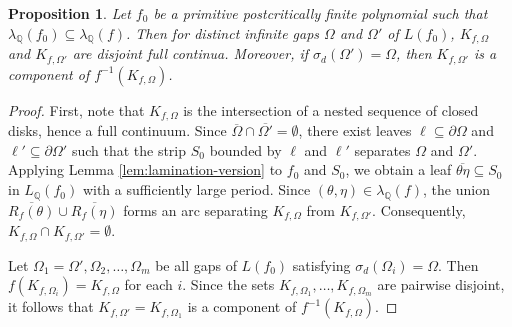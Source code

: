 \documentclass[a4paper,reqno,times, 11pt]{amsart}
\newtheorem{proposition}[theorem]{Proposition}
\theoremstyle{remark}
\theoremstyle{plain}
\numberwithin{equation}{section}
\def\Q{\mathbb Q}
\begin{document}
	
	\begin{proposition}\label{pro:ren}
	Let $f_0$ be a primitive postcritically finite polynomial such that $\lambda_\Q(f_0)\subseteq\lambda_\Q(f)$.	Then for distinct infinite gaps $\Omega$ and $\Omega'$ of $L(f_0)$, $K_{f,\Omega}$ and $K_{f,\Omega'}$ are disjoint full continua. Moreover,
		if $\sigma_d(\Omega')=\Omega$, then $K_{f,\Omega'}$ is a component of $f^{-1}(K_{f,\Omega})$. 	\end{proposition}
	\begin{proof}
		First, note that $K_{f,\Omega}$ is the intersection of a nested sequence of closed disks, hence a full continuum. Since $\overline{\Omega}\cap\overline{\Omega'}=\emptyset$, there exist leaves $\ell\subseteq\partial\Omega$ and $\ell'\subseteq\partial\Omega'$ such that the strip $S_0$ bounded by $\ell$ and $\ell'$ separates $\Omega$ and $\Omega'$. Applying Lemma \ref{lem:lamination-version} to $f_0$ and $S_0$, we obtain a leaf $\overline{\theta\eta}\subseteq S_0$ in $L_\mathbb{Q}(f_0)$ with a sufficiently large period. Since $(\theta,\eta)\in \lambda_\Q(f)$, the union $\overline{R_f(\theta)} \cup \overline{R_f(\eta)}$ forms an arc separating $K_{f,\Omega}$ from $K_{f,\Omega'}$. Consequently, $K_{f,\Omega} \cap K_{f,\Omega'} = \emptyset$.
		
		Let  $\Omega_1 = \Omega', \Omega_2, \ldots, \Omega_m$ be all gaps of $L(f_0)$ satisfying $\sigma_d(\Omega_i) = \Omega$. Then $f(K_{f,\Omega_i}) = K_{f,\Omega}$ for each $i$. Since the sets $K_{f,\Omega_1}, \ldots, K_{f,\Omega_m}$ are pairwise disjoint, it follows that $K_{f,\Omega'}=K_{f,\Omega_1}$ is a component of $f^{-1}(K_{f,\Omega})$.
%		
	\end{proof}
	
\end{document}
